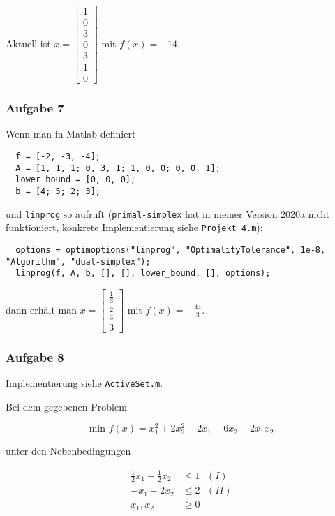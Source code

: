 \documentclass[a4paper, 12pt]{report}
\begin{document}
Aktuell ist $x = \begin{bmatrix} 1\\0\\3\\0\\3\\1\\0 \end{bmatrix}$ mit $f(x) = -14$.

\subsubsection{Aufgabe 7}
Wenn man in Matlab definiert

\begin{lstlisting}
  f = [-2, -3, -4];
  A = [1, 1, 1; 0, 3, 1; 1, 0, 0; 0, 0, 1];
  lower_bound = [0, 0, 0];
  b = [4; 5; 2; 3];\end{lstlisting}

und \lstinline[basicstyle=\ttfamily\color{black}]|linprog| so aufruft
(\lstinline[basicstyle=\ttfamily\color{black}]|primal-simplex| hat in meiner Version 2020a nicht funktioniert,
konkrete Implementierung siehe \lstinline[basicstyle=\ttfamily\color{black}]|Projekt_4.m|):

\begin{lstlisting}
  options = optimoptions("linprog", "OptimalityTolerance", 1e-8, "Algorithm", "dual-simplex");
  linprog(f, A, b, [], [], lower_bound, [], options);\end{lstlisting}

dann erhält man $x = \begin{bmatrix}\frac{1}{3}\\[6pt]\frac{2}{3}\\[6pt]3\end{bmatrix}$ mit $f(x) = -\frac{44}{3}$.

\subsubsection{Aufgabe 8}
Implementierung siehe \lstinline[basicstyle=\ttfamily\color{black}]|ActiveSet.m|.\par
Bei dem gegebenen Problem

$$ \text{min } f(x) = x_1^2 + 2x_2^2 - 2x_1 - 6x_2 - 2x_1x_2 $$

unter den Nebenbedingungen

\begin{align*} 
  \frac{1}{2}x_1 + \frac{1}{2}x_2 &\leq 1 \text{  } (I)\\
  -x_1 + 2x_2 &\leq 2 \text{  } (II)\\
  x_1, x_2 &\geq 0
\end{align*}
\end{document}
